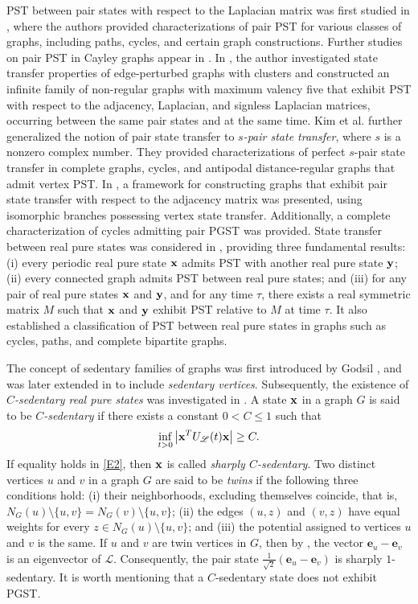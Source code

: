 \documentclass[12pt,a4paper]{article}
\def \e {{\mathbf e}}
\def \x {{\bf x}}
\def \y {{\bf y}}
\begin{document}
PST between pair states with respect to the Laplacian matrix was first studied in \cite{chen}, where the authors provided characterizations of pair PST for various classes of graphs, including paths, cycles, and certain graph constructions. Further studies on pair PST in Cayley graphs appear in \cite{cao2021, cao2022}. In \cite{pal9}, the author investigated state transfer properties of edge-perturbed graphs with clusters and constructed an infinite family of non-regular graphs with maximum valency five that exhibit PST with respect to the adjacency, Laplacian, and signless Laplacian matrices, occurring between the same pair states and at the same time. Kim et al. \cite{kim} further generalized the notion of pair state transfer to \emph{$s$-pair state transfer}, where $s$ is a nonzero complex number. They provided characterizations of perfect $s$-pair state transfer in complete graphs, cycles, and antipodal distance-regular graphs that admit vertex PST. In \cite{pal7}, a framework for constructing graphs that exhibit pair state transfer with respect to the adjacency matrix was presented, using isomorphic branches possessing vertex state transfer. Additionally, a complete characterization of cycles admitting pair PGST was provided. State transfer between real pure states was considered in \cite{god25}, providing three fundamental results: (i) every periodic real pure state $\x$ admits PST with another real pure state $\y$; (ii) every connected graph admits PST between real pure states; and (iii) for any pair of real pure states $\x$ and $\y$, and for any time $\tau$, there exists a real symmetric matrix $M$ such that $\x$ and $\y$ exhibit PST relative to $M$ at time $\tau$. It also established a classification of PST between real pure states in graphs such as cycles, paths, and complete bipartite graphs.

The concept of sedentary families of graphs was first introduced by Godsil \cite{God5}, and was later extended in \cite{mont} to include \emph{sedentary vertices}. Subsequently, the existence of \emph{$C$-sedentary real pure states} was investigated in \cite{pal9}. A state $\x$ in a graph $G$ is said to be \emph{$C$-sedentary} if there exists a constant $0 < C \leq 1$ such that
\begin{equation}\label{E2}
\inf_{t > 0} \left| \x^T U_\mathscr{L}(t) \x \right| \geq C.
\end{equation}
If equality holds in \eqref{E2}, then $\x$ is called \emph{sharply $C$-sedentary}. Two distinct vertices $u$ and $v$ in a graph $G$ are said to be \emph{twins} if the following three conditions hold: (i) their neighborhoods, excluding themselves coincide, that is, $N_G(u) \setminus \{u,v\} = N_G(v) \setminus \{u,v\}$; (ii) the edges $(u,z)$ and $(v,z)$ have equal weights for every $z \in N_G(u) \setminus \{u,v\}$; and (iii) the potential assigned to vertices $u$ and $v$ is the same. If $u$ and $v$ are twin vertices in $G$, then by \cite[Lemma 2.9]{mont2}, the vector $\e_u - \e_v$ is an eigenvector of $\mathscr{L}$. Consequently, the pair state $\frac{1}{\sqrt{2}}(\e_u - \e_v)$ is sharply $1$-sedentary. It is worth mentioning that a $C$-sedentary state does not exhibit PGST.
\end{document}
